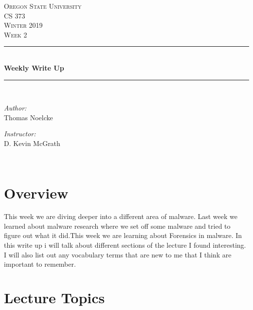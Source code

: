 \documentclass[letterpaper, onecolumn,10pt]{IEEEtran}
\begin{document}
    \begin{titlepage}
    \newcommand{\HRule}{\rule{\linewidth}{0.5mm}}
    \center
    \textsc{\Large Oregon State University}\\[1.5cm]
    \textsc{\Large CS 373}\\[0.5cm]
    \textsc{\Large Winter 2019}\\[0.5cm]
    \textsc{\Large Week 2}\\[0.5cm]
    \HRule \\[0.4cm]
    { \huge \bfseries Weekly Write Up}\\[0.4cm] %
    \HRule \\[1.5cm]
    \begin{minipage}{0.4\textwidth}
        \begin{flushleft} \large
        \emph{Author:}\\
        Thomas Noelcke
        \end{flushleft}
    \end{minipage}
    \begin{minipage}{0.4\textwidth}
        \begin{flushright} \large
        \emph{Instructor:} \\
        D. Kevin McGrath\\
        \end{flushright}
    \end{minipage}\\[2cm]
		\end{titlepage}
		
		
		\section{Overview}
        This week we are diving deeper into a different area of malware. Last week we learned about malware research where we set off some malware and tried to figure out what it did.This week we are learning about Forensics in malware. In this write up i will talk about different sections of the lecture I found interesting. I will also list out any vocabulary terms that are new to me that I think are important to remember.\\
        
        \section{Lecture Topics}
        
\end{document}
